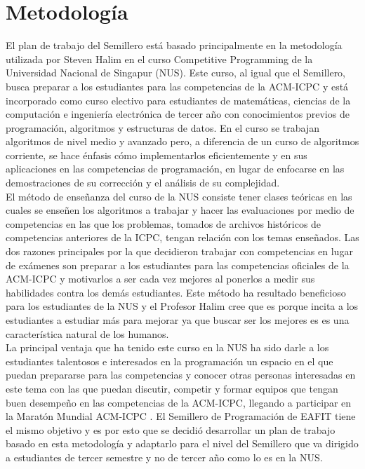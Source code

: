 \documentclass[conference]{IEEEtran}
\begin{document}
\section{Metodología}
El plan de trabajo del Semillero está basado principalmente en la metodología utilizada por Steven Halim en el curso Competitive Programming de la Universidad Nacional de Singapur (NUS). Este curso, al igual que el Semillero, busca preparar a los estudiantes para las competencias de la ACM-ICPC y está incorporado como curso electivo para estudiantes de matemáticas, ciencias de la computación e ingeniería electrónica de tercer año con conocimientos previos de programación, algoritmos y estructuras de datos. En el curso se trabajan algoritmos de nivel medio y avanzado pero, a diferencia de un curso de algoritmos corriente, se hace énfasis cómo implementarlos eficientemente y en sus aplicaciones en las competencias de programación, en lugar de enfocarse en las demostraciones de su corrección y el análisis de su complejidad\cite{PaperHalim}.\\
El método de enseñanza del curso de la NUS consiste tener clases teóricas en las cuales se enseñen los algoritmos a trabajar y hacer las evaluaciones por medio de competencias en las que los problemas, tomados de archivos históricos de competencias anteriores de la ICPC, tengan relación con los temas enseñados. Las dos razones principales por la que decidieron trabajar con competencias en lugar de exámenes son preparar a los estudiantes para las competencias oficiales de la ACM-ICPC y motivarlos a ser cada vez mejores al ponerlos a medir sus habilidades contra los demás estudiantes. Este método ha resultado beneficioso para los estudiantes de la NUS y el Profesor Halim cree que es porque incita a los estudiantes a estudiar más para mejorar ya que buscar ser los mejores es es una característica natural de los humanos.\\
La principal ventaja que ha tenido este curso en la NUS ha sido darle a los estudiantes talentosos e interesados en la programación un espacio en el que puedan prepararse para las competencias y conocer otras personas interesadas en este tema con las que puedan discutir, competir y formar equipos que tengan buen desempeño en las competencias de la ACM-ICPC, llegando a participar en la Maratón Mundial ACM-ICPC \cite{AlgoNUS}. El Semillero de Programación de EAFIT tiene el mismo objetivo y es por esto que se decidió desarrollar un plan de trabajo basado en esta metodología y adaptarlo para el nivel del Semillero que va dirigido a estudiantes de tercer semestre y no de tercer año como lo es en la NUS.
\end{document}
